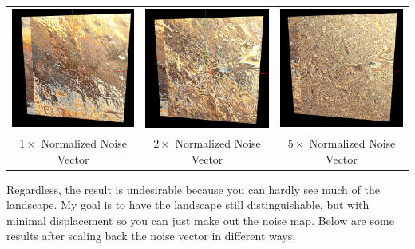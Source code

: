 \documentclass[twoside,11pt]{article}
\theoremstyle{definition}
\begin{document}
\begin{center}\begin{tabular}{ccc}
	\includegraphics[width=.3\textwidth]{1x_normal_noise} &
	\includegraphics[width=.3\textwidth]{2x_normal_noise} &
	\includegraphics[width=.3\textwidth]{5x_normal_noise}\\
	$1\times$ Normalized Noise Vector & $2\times$ Normalized Noise Vector & $5\times$ Normalized Noise Vector
\end{tabular}\end{center}

Regardless, the result is undesirable because you can hardly see much of the landscape. My goal is to have the landscape still distinguishable, but with minimal displacement so you can just make out the noise map. Below are some results after scaling back the noise vector in different ways.
\end{document}
